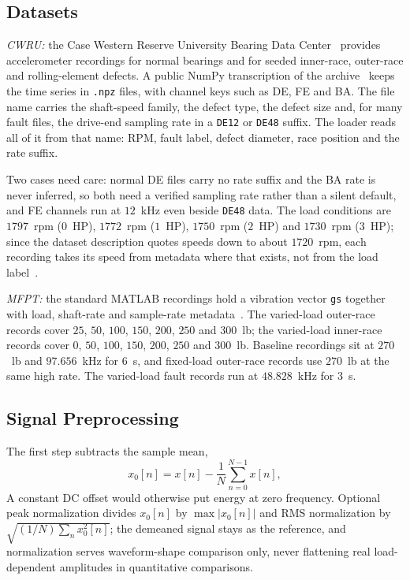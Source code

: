 \subsection{Datasets}
\emph{CWRU:} the Case Western Reserve University Bearing Data
Center~\cite{cwru_datacenter} provides accelerometer recordings for normal
bearings and for seeded inner-race, outer-race and rolling-element defects. A
public NumPy transcription of the archive~\cite{rigas2024} keeps the time
series in \texttt{.npz} files, with channel keys such as DE, FE and BA. The
file name carries the shaft-speed family, the defect type, the defect size
and, for many fault files, the drive-end sampling rate in a \texttt{DE12} or
\texttt{DE48} suffix. The loader reads all of it from that name: RPM, fault
label, defect diameter, race position and the rate suffix.

Two cases need care: normal DE files carry no rate suffix and the BA rate is
never inferred, so both need a verified sampling rate rather than a silent
default, and FE channels run at $12$~kHz even beside \texttt{DE48} data. The
load conditions are $1797$~rpm ($0$~HP), $1772$~rpm ($1$~HP), $1750$~rpm
($2$~HP) and $1730$~rpm ($3$~HP); since the dataset description quotes speeds
down to about $1720$~rpm, each recording takes its speed from metadata where
that exists, not from the load label~\cite{smith2015}.

\emph{MFPT:} the standard MATLAB recordings hold a vibration vector
\texttt{gs} together with load, shaft-rate and sample-rate
metadata~\cite{bechhoefer2013}. The varied-load outer-race records cover $25$,
$50$, $100$, $150$, $200$, $250$ and $300$~lb; the varied-load inner-race
records cover $0$, $50$, $100$, $150$, $200$, $250$ and $300$~lb. Baseline
recordings sit at $270$~lb and $97.656$~kHz for $6$~s, and fixed-load
outer-race records use $270$~lb at the same high rate. The varied-load fault
records run at $48.828$~kHz for $3$~s.

\subsection{Signal Preprocessing}
The first step subtracts the sample mean,
\begin{equation}
  x_0[n] = x[n] - \frac{1}{N}\sum_{n=0}^{N-1}x[n],
  \label{eq:demean}
\end{equation}
A constant DC offset would otherwise put energy at zero frequency. Optional
peak normalization divides $x_0[n]$ by $\max|x_0[n]|$ and RMS normalization by
$\sqrt{(1/N)\sum_n x_0^2[n]}$; the demeaned signal stays as the reference, and
normalization serves waveform-shape comparison only, never flattening real
load-dependent amplitudes in quantitative comparisons.


